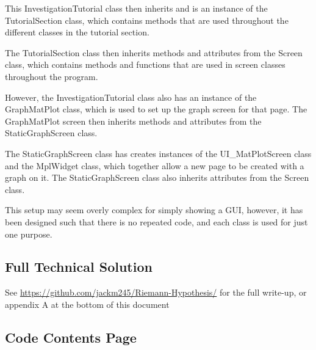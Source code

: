 \documentclass[12pt]{article}
\begin{document}
This InvestigationTutorial class then inherits and is an instance of the TutorialSection class, which contains methods that are used throughout the different classes in the tutorial section.

The TutorialSection class then inherits methods and attributes from the Screen class, which contains methods and functions that are used in screen classes throughout the program.

However, the InvestigationTutorial class also has an instance of the GraphMatPlot class, which is used to set up the graph screen for that page. The GraphMatPlot screen then inherits methods and attributes from the StaticGraphScreen class.

The StaticGraphScreen class has creates instances of the UI\_MatPlotScreen class and the MplWidget class, which together allow a new page to be created with a graph on it. The StaticGraphScreen class also inherits attributes from the Screen class.

This setup may seem overly complex for simply showing a GUI, however, it has been designed such that there is no repeated code, and each class is used for just one purpose.

\clearpage

\subsection{Full Technical Solution}

See \url{https://github.com/jackm245/Riemann-Hypothesis/} for the full write-up, or appendix A at the bottom of this document

\subsection{Code Contents Page}
\end{document}
